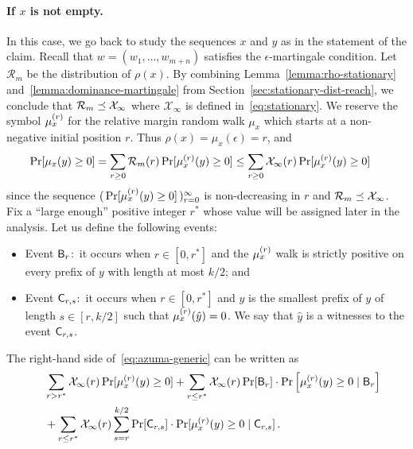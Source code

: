 \paragraph{If $x$ is not empty.} 
In this case, we go back to study the sequences $x$ and $y$ as in the statement of the claim.
Recall that $w = (w_1, \ldots, w_{m+n})$ satisfies the $\epsilon$-martingale condition. 
Let $\mathcal{R}_m$ be the distribution of $\rho(x)$.
By combining Lemma~\ref{lemma:rho-stationary} and~\ref{lemma:dominance-martingale} from Section~\ref{sec:stationary-dist-reach}, 
we conclude that $\mathcal{R}_m \preceq \mathcal{X}_\infty$ 
where $\mathcal{X}_\infty$ is defined in~\eqref{eq:stationary}.
We reserve the symbol $\mu_x^{(r)}$ for the relative margin 
random walk $\mu_x$ which starts at a non-negative initial position $r$. 
Thus $\rho(x) = \mu_x(\epsilon) = r$, and
\begin{align}\label{eq:azuma-generic}
\Pr[\mu_x(y) \geq 0] 
&= \sum_{r \geq 0}{\mathcal{R}_m(r) \Pr[\mu_x^{(r)}(y) \geq 0]} 
\leq \sum_{r \geq 0}{\mathcal{X}_\infty(r) \Pr[\mu_x^{(r)}(y) \geq 0]} 
\, 
\end{align}
since the sequence $( \, \Pr[\mu_x^{(r)}(y) \geq 0] \, )_{r=0}^\infty$ is non-decreasing in $r$ 
and $\mathcal{R}_m \preceq \mathcal{X}_\infty$. 
Fix a ``large enough'' positive integer $r^*$ whose value will be assigned later in the analysis. 
Let us define the following events:
 \begin{itemize}
  \item Event $\mathsf{B}_r$:~it occurs when $r \in [0, r^*]$ and the $\mu_x^{(r)}$ walk is strictly positive on every prefix of $y$ with length at most $k/2$; and 
  \item Event $\mathsf{C}_{r,s}$:~it occurs when $r \in [0, r^*]$ and 
  $\hat{y}$ is the smallest prefix of $y$ of length $s \in [r, k/2]$ 
  such that $\mu_x^{(r)}(\hat{y}) = 0$. 
  We say that $\hat{y}$ is a witnesses to the event $\mathsf{C}_{r, s}$.
\end{itemize}
The right-hand side of~\eqref{eq:azuma-generic} can be written as
\begin{align*}
     &\quad \sum_{r>r^*}{\mathcal{X}_\infty(r) \Pr[\mu_x^{(r)}(y) \geq 0]} 
		+ \sum_{r \leq r^*}{\mathcal{X}_\infty(r) \Pr[\mathsf{B}_r] \cdot \Pr\left[\mu_x^{(r)}(y) \geq 0 \mid \mathsf{B}_r\right]} \\
    &\quad+ \sum_{r \leq r^*}{\mathcal{X}_\infty(r) \sum_{s = r}^{k/2}{\Pr[\mathsf{C}_{r,s}] \cdot \Pr[\mu_x^{(r)}(y) \geq 0 \mid \mathsf{C}_{r,s}]} }
    \, .
\end{align*} 
